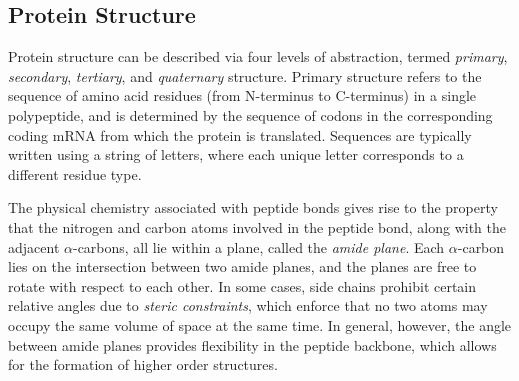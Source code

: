 \subsection{Protein Structure}

Protein structure can be described via four levels of abstraction, termed \textit{primary}, \textit{secondary}, \textit{tertiary}, and \textit{quaternary} structure.
Primary structure refers to the sequence of amino acid residues (from N-terminus to C-terminus) in a single polypeptide, and is determined by the sequence of codons in the corresponding coding mRNA from which the protein is translated.
Sequences are typically written using a string of letters, where each unique letter corresponds to a different residue type. 

The physical chemistry associated with peptide bonds gives rise to the property that the nitrogen and carbon atoms involved in the peptide bond, along with the adjacent $\alpha$-carbons, all lie within a plane, called the \textit{amide plane}.
Each $\alpha$-carbon lies on the intersection between two amide planes, and the planes are free to rotate with respect to each other. 
In some cases, side chains prohibit certain relative angles due to \textit{steric constraints}, which enforce that no two atoms may occupy the same volume of space at the same time.
In general, however, the angle between amide planes provides flexibility in the peptide backbone, which allows for the formation of higher order structures.

